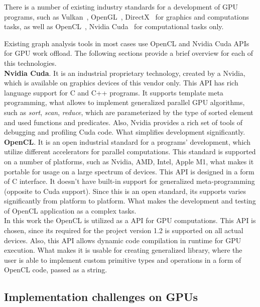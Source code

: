 There is a number of existing industry standards for a development of GPU programs, such as Vulkan~\cite{net:spec_vulkan}, OpenGL~\cite{net:spec_opencl}, DirectX~\cite{net:spec_direct3d} for graphics and computations tasks, as well as OpenCL~\cite{net:spec_opencl}, Nvidia Cuda~\cite{net:cuda_toolkit_docs}
for computational tasks only.

Existing graph analysis tools in most cases use OpenCL and Nvidia Cuda APIs for GPU work offload. The following sections provide a brief overview for each of this technologies.\\

\textbf{Nvidia Cuda}. It is an industrial proprietary technology, created by a Nvidia, which is available on graphics devices of this vendor only. This API has rich language support for C and C++ programs. It supports template meta programming, what allows to implement generalized parallel GPU algorithms, such as \textit{sort}, \textit{scan}, \textit{reduce}, which are parameterized by the type of sorted element and used functions and predicates. Also, Nvidia provides a rich set of tools of debugging and profiling Cuda code. What simplifies development significantly.\\

\textbf{OpenCL}. It is an open industrial standard for a programs' development, which utilize different accelerators for parallel computations. This standard is supported on a number of platforms, such as Nvidia, AMD, Intel, Apple M1, what makes it portable for usage on a large spectrum of devices. This API is designed in a form of C interface. It doesn't have built-in support for generalized meta-programming (opposite to Cuda support). Since this is an open standard, its supports varies significantly from platform to platform. What makes the development and testing of OpenCL application as a complex tasks.\\

In this work the OpenCL is utilized as a API for GPU computations. This API is chosen, since its required for the project version 1.2 is supported on all actual devices. Also, this API allows dynamic code compilation in runtime for GPU execution. What makes it is usable for creating generalized library, where the user is able to implement custom primitive types and operations in a form of OpenCL code, passed as a string.

\subsection{Implementation challenges on GPUs}

